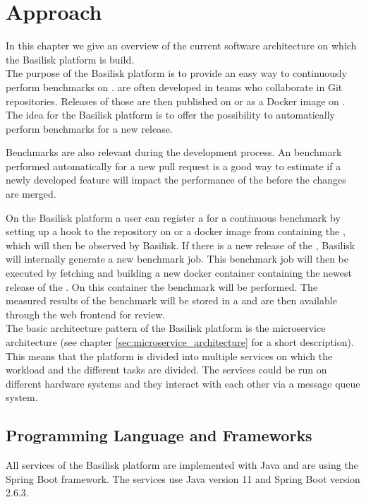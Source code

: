 \chapter{Approach}
\label{ch:approach}

In this chapter we give an overview of the current software architecture on which the Basilisk platform is build.
\\

The purpose of the Basilisk platform is to provide an easy way to continuously perform benchmarks on \tsp{}.
\tsp{} are often developed in teams who collaborate in Git repositories.
Releases of those \tsp{} are then published on \gh{} or as a Docker image on \dockh{}.
The idea for the Basilisk platform is to offer the possibility to automatically perform benchmarks for a new \ts{} release.

Benchmarks are also relevant during the development process.
An benchmark performed automatically for \eg{} a new pull request is a good way to estimate if a newly developed feature will impact the performance of the \ts{} before the changes are merged.

On the Basilisk platform a user can register a \ts{} for a continuous benchmark by setting up a hook to the repository on \gh{} or a docker image from \dockh{} containing the \ts{}, which will then be observed by Basilisk.
If there is a new release of the \ts{}, Basilisk will internally generate a new benchmark job.
This benchmark job will then be executed by fetching and building a new docker container containing the newest release of the \ts{}.
On this container the benchmark will be performed.
The measured results of the benchmark will be stored in a \ts{} and are then available through the web frontend for review.
\\

The basic architecture pattern of the Basilisk platform is the microservice architecture (see chapter \ref{sec:microservice_architecture} for a short description). 
This means that the platform is divided into multiple services on which the workload and the different tasks are divided.
The services could be run on different hardware systems and they interact with each other via a message queue system.
\\

\section{Programming Language and Frameworks}
\label{sec:prog_lang_and_framework}
All services of the Basilisk platform are implemented with Java and are using the Spring Boot framework.
The services use Java version 11 and Spring Boot version 2.6.3.

